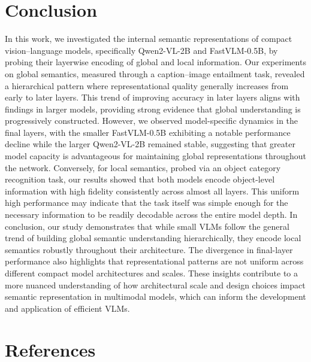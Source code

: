 \documentclass[11pt]{article}
\begin{document}
\section{Conclusion}
In this work, we investigated the internal semantic representations of compact vision--language models, specifically Qwen2-VL-2B and FastVLM-0.5B, by probing their layerwise encoding of global and local information. Our experiments on global semantics, measured through a caption--image entailment task, revealed a hierarchical pattern where representational quality generally increases from early to later layers. This trend of improving accuracy in later layers aligns with findings in larger models, providing strong evidence that global understanding is progressively constructed. However, we observed model-specific dynamics in the final layers, with the smaller FastVLM-0.5B exhibiting a notable performance decline while the larger Qwen2-VL-2B remained stable, suggesting that greater model capacity is advantageous for maintaining global representations throughout the network.
Conversely, for local semantics, probed via an object category recognition task, our results showed that both models encode object-level information with high fidelity consistently across almost all layers. This uniform high performance may indicate that the task itself was simple enough for the necessary information to be readily decodable across the entire model depth. In conclusion, our study demonstrates that while small VLMs follow the general trend of building global semantic understanding hierarchically, they encode local semantics robustly throughout their architecture. The divergence in final-layer performance also highlights that representational patterns are not uniform across different compact model architectures and scales. These insights contribute to a more nuanced understanding of how architectural scale and design choices impact semantic representation in multimodal models, which can inform the development and application of efficient VLMs.

\section{References}


\nocite{*}
\appendix
\end{document}

